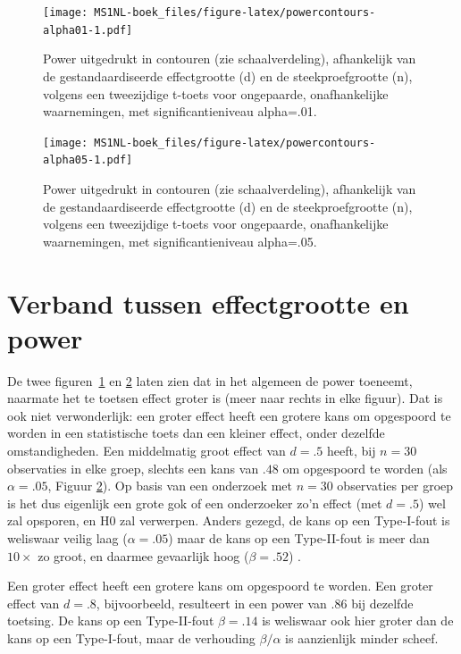 \documentclass[
]{book}
\begin{document}
\begin{figure}
\centering
\texttt{[image: MS1NL-boek\_files/figure-latex/powercontours-alpha01-1.pdf]}
\caption{\label{fig:powercontours-alpha01}Power uitgedrukt in contouren (zie schaalverdeling), afhankelijk van de gestandaardiseerde effectgrootte (d) en de steekproefgrootte (n), volgens een tweezijdige t-toets voor ongepaarde, onafhankelijke waarnemingen, met significantieniveau alpha=.01.}
\end{figure}

\begin{figure}
\centering
\texttt{[image: MS1NL-boek\_files/figure-latex/powercontours-alpha05-1.pdf]}
\caption{\label{fig:powercontours-alpha05}Power uitgedrukt in contouren (zie schaalverdeling), afhankelijk van de gestandaardiseerde effectgrootte (d) en de steekproefgrootte (n), volgens een tweezijdige t-toets voor ongepaarde, onafhankelijke waarnemingen, met significantieniveau alpha=.05.}
\end{figure}

\hypertarget{sec:effectgrootte-power}{%
\section{Verband tussen effectgrootte en power}\label{sec:effectgrootte-power}}

De twee figuren~\ref{fig:powercontours-alpha01} en
\ref{fig:powercontours-alpha05} laten zien dat in het algemeen de
power toeneemt, naarmate het te toetsen effect groter is (meer naar
rechts in elke figuur). Dat is ook niet verwonderlijk: een groter effect
heeft een grotere kans om opgespoord te worden in een statistische toets
dan een kleiner effect, onder dezelfde omstandigheden. Een middelmatig
groot effect van \(d=.5\) heeft, bij \(n=30\) observaties in elke groep,
slechts een kans van \(.48\) om opgespoord te worden (als \(\alpha=.05\), Figuur \ref{fig:powercontours-alpha05}). Op basis van een
onderzoek met \(n=30\) observaties per groep is het dus eigenlijk een
grote gok of een onderzoeker zo'n effect (met \(d=.5\)) wel zal opsporen,
en H0 zal verwerpen. Anders gezegd, de kans op een Type-I-fout is
weliswaar veilig laag (\(\alpha=.05\)) maar de kans op een Type-II-fout is
meer dan \(10\times\) zo groot, en daarmee gevaarlijk hoog (\(\beta=.52\)) \citep[Ch.12]{Rose08}.

Een groter effect heeft een grotere kans om opgespoord te worden. Een
groter effect van \(d=.8\), bijvoorbeeld, resulteert in een power van
\(.86\) bij dezelfde toetsing. De kans op een Type-II-fout \(\beta=.14\) is
weliswaar ook hier groter dan de kans op een Type-I-fout, maar de
verhouding \(\beta/\alpha\) is aanzienlijk minder scheef.
\end{document}
